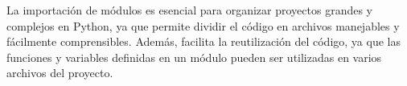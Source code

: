     La importación de módulos es esencial para organizar proyectos grandes y complejos en Python, ya que permite dividir el código en archivos manejables y fácilmente comprensibles. Además, facilita la reutilización del código, ya que las funciones y variables definidas en un módulo pueden ser utilizadas en varios archivos del proyecto.



